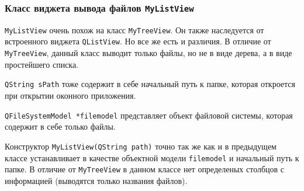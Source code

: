 \subsubsection{Класс виджета вывода файлов \texttt{MyListView}}

\texttt{MyListView} очень похож на класс \texttt{MyTreeView}.
Он также наследуется от встроенного виджета \texttt{QListView}\cite{listview}.
Но все же есть и различия.
В отличие от \texttt{MyTreeView}, данный класс выводит только файлы, но не в виде дерева, а в виде простейшего списка.



\texttt{QString sPath} тоже содержит в себе начальный путь к папке, которая откроется при открытии оконного приложения.



\texttt{QFileSystemModel *filemodel} представляет объект файловой системы, которая содержит в себе только файлы.



Конструктор \texttt{MyListView(QString path)} точно так же как и в предыдущем классе устанавливает в качестве объектной модели\cite{listview} \texttt{filemodel} и начальный путь к папке.
В отличие от \texttt{MyTreeView} в данном классе нет определеных столбцов с информацией (выводятся только названия файлов).

